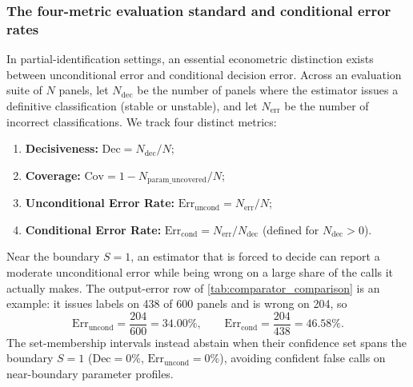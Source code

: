 \documentclass[10pt,twocolumn,letterpaper]{article}
\theoremstyle{definition}
\theoremstyle{remark}
\begin{document}
\subsubsection{The four-metric evaluation standard and conditional error rates}
\label{sec:metric_standard}
In partial-identification settings, an essential econometric distinction exists between unconditional error and conditional decision error. Across an evaluation suite of $N$ panels, let $N_{\mathrm{dec}}$ be the number of panels where the estimator issues a definitive classification (stable or unstable), and let $N_{\mathrm{err}}$ be the number of incorrect classifications. We track four distinct metrics:
\begin{enumerate}
    \item \textbf{Decisiveness:} $\mathrm{Dec} = N_{\mathrm{dec}} / N$;
    \item \textbf{Coverage:} $\mathrm{Cov} = 1 - N_{\mathrm{param\_uncovered}} / N$;
    \item \textbf{Unconditional Error Rate:} $\mathrm{Err}_{\mathrm{uncond}} = N_{\mathrm{err}} / N$;
    \item \textbf{Conditional Error Rate:} $\mathrm{Err}_{\mathrm{cond}} = N_{\mathrm{err}} / N_{\mathrm{dec}}$ (defined for $N_{\mathrm{dec}} > 0$).
\end{enumerate}
Near the boundary $S=1$, an estimator that is forced to decide can report a moderate unconditional error while being wrong on a large share of the calls it actually makes. The output-error row of \cref{tab:comparator_comparison} is an example: it issues labels on 438 of 600 panels and is wrong on 204, so
\begin{equation}
 \mathrm{Err}_{\mathrm{uncond}}=\frac{204}{600}=34.00\%,\qquad \mathrm{Err}_{\mathrm{cond}} = \frac{204}{438} = 46.58\%.
\end{equation}
The set-membership intervals instead abstain when their confidence set spans the boundary $S=1$ ($\mathrm{Dec} = 0\%$, $\mathrm{Err}_{\mathrm{uncond}} = 0\%$), avoiding confident false calls on near-boundary parameter profiles.
\end{document}
